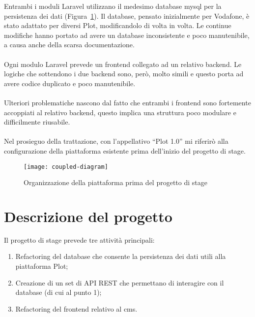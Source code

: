 Entrambi i moduli Laravel utilizzano il medesimo database \gls{mysql}\glsfirstoccur{} per la persistenza dei dati (Figura~\ref{fig:coupled}). 
Il database, pensato inizialmente per Vodafone, è stato adattato per diversi Plot, modificandolo di volta in volta. Le continue modifiche hanno portato ad avere un database inconsistente e poco manutenibile, a causa anche della scarsa documentazione.
\\ \\
Ogni modulo Laravel prevede un \gls{frontend}\glsfirstoccur{} collegato ad un relativo \gls{backend}\glsfirstoccur{}. Le logiche che sottendono i due \gls{backend}\glsfirstoccur{} sono, però, molto simili e questo porta ad avere codice duplicato e poco manutenibile.
\\ \\
Ulteriori problematiche nascono dal fatto che entrambi i \gls{frontend}\glsfirstoccur{} sono fortemente accoppiati al relativo \gls{backend}\glsfirstoccur{}, questo implica una struttura poco modulare e difficilmente riusabile.
\\ \\
Nel prosieguo della trattazione, con l’appellativo “Plot 1.0” mi riferirò alla configurazione della piattaforma esistente prima dell'inizio del progetto di stage.

\begin{figure}[htbp]
\begin{center}
\texttt{[image: coupled-diagram]}
\caption{Organizzazione della piattaforma prima del progetto di stage}
\label{fig:coupled}
\end{center}
\end{figure}

\section{Descrizione del progetto}
Il progetto di stage prevede tre attività principali:
\begin{enumerate}
	\item Refactoring del database che consente la persistenza dei dati utili alla piattaforma Plot;
	\item Creazione di un set di API REST che permettano di interagire con il database (di cui al punto 1);
	\item Refactoring del \gls{frontend}\glsfirstoccur{} relativo al \gls{cms}\glsfirstoccur.
\end{enumerate}

